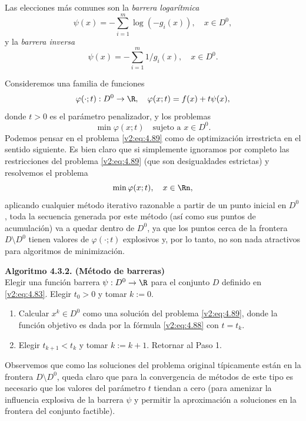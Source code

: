 Las elecciones más comunes son la \textit{barrera logarítmica}
\begin{equation}
    \psi(x) = -\sum_{i=1}^m \log(-g_i(x)), \quad x \in D^0,
    \label{v2:eq:4.86}
\end{equation}
y la \textit{barrera inversa}
\begin{equation}
    \psi(x) = -\sum_{i=1}^m 1/g_i(x), \quad x \in D^0.
    \label{v2:eq:4.87}
\end{equation}

Consideremos una familia de funciones
\begin{equation}
    \varphi(\cdot; t) : D^0 \to \R, \quad \varphi(x; t) = f(x) + t\psi(x),
    \label{v2:eq:4.88}
\end{equation}
donde $t > 0$ es el parámetro penalizador, y los problemas
\begin{equation}
    \min \varphi(x; t) \quad \text{sujeto a } x \in D^0.
    \label{v2:eq:4.89}
\end{equation}
Podemos pensar en el problema \eqref{v2:eq:4.89} como de optimización irrestricta en el sentido siguiente. Es bien claro que si simplemente ignoramos por completo las restricciones del problema \eqref{v2:eq:4.89} (que son desigualdades estrictas) y resolvemos el problema
\[
    \min \varphi(x; t), \quad x \in \Rn,
\]
aplicando cualquier método iterativo razonable a partir de un punto inicial en $D^0$, toda la secuencia generada por este método (así como sus puntos de acumulación) va a quedar dentro de $D^0$, ya que los puntos cerca de la frontera $D \setminus D^0$ tienen valores de $\varphi(\cdot; t)$ explosivos y, por lo tanto, no son nada atractivos para algoritmos de minimización.

\vspace{0.3cm}
\noindent\textbf{Algoritmo 4.3.2. (Método de barreras)}\\
Elegir una función barrera $\psi : D^0 \to \R$ para el conjunto $D$ definido en \eqref{v2:eq:4.83}. Elegir $t_0 > 0$ y tomar $k := 0$.
\begin{enumerate}
    \item Calcular $x^k \in D^0$ como una solución del problema \eqref{v2:eq:4.89}, donde la función objetivo es dada por la fórmula \eqref{v2:eq:4.88} con $t = t_k$.
    \item Elegir $t_{k+1} < t_k$ y tomar $k := k + 1$. Retornar al Paso 1.
\end{enumerate}
\vspace{0.3cm}

Observemos que como las soluciones del problema original típicamente están en la frontera $D \setminus D^0$, queda claro que para la convergencia de métodos de este tipo es necesario que los valores del parámetro $t$ tiendan a cero (para amenizar la influencia explosiva de la barrera $\psi$ y permitir la aproximación a soluciones en la frontera del conjunto factible).

